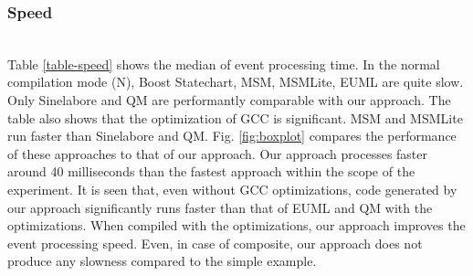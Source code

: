 \subsubsection{Speed} ~\\
\noindent
{} Table \ref{table-speed} shows the median of event processing time. 
In the normal compilation mode (N), Boost Statechart, MSM, MSMLite, EUML are quite slow. 
Only Sinelabore and QM are performantly comparable with our approach. 
The table also shows that the optimization of GCC is significant. 
MSM and MSMLite run faster than Sinelabore and QM.   
Fig. \ref{fig:boxplot} compares the performance of these approaches to that of our approach.
Our approach processes faster around 40 milliseconds than the fastest approach within the scope of the experiment.
It is seen that, even without GCC optimizations, code generated by our approach significantly runs faster than that of EUML and QM with the optimizations. 
When compiled with the optimizations, our approach improves the event processing speed. 
Even, in case of composite, our approach does not produce any slowness compared to the simple example. 

